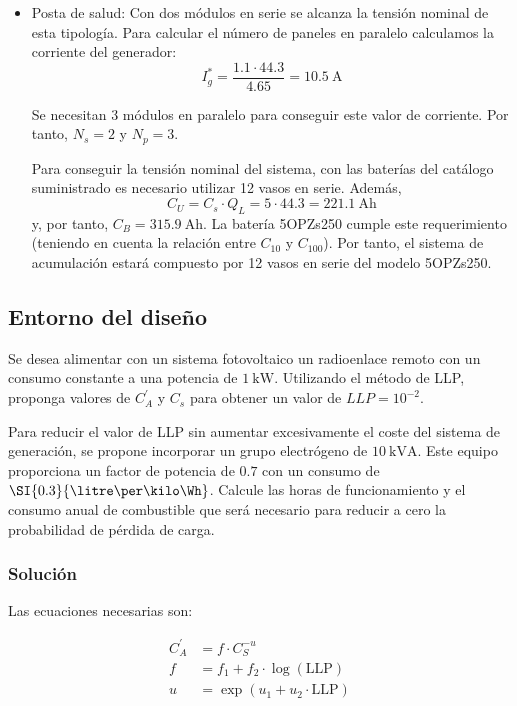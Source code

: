 \begin{itemize}
\item Posta de salud: Con dos módulos en serie se alcanza la tensión
  nominal de esta tipología. Para calcular el número de paneles en
  paralelo calculamos la corriente del generador:
  \[
  I_g^* = \frac{1.1 \cdot 44.3 }{4.65}=\SI{10.5}{\ampere}
  \]

  Se necesitan 3 módulos en paralelo para conseguir este valor de
  corriente. Por tanto, $N_s=2$ y $N_p=3$.

  Para conseguir la tensión nominal del sistema, con las baterías del
  catálogo suministrado es necesario utilizar 12 vasos en
  serie. Además,
  \[
  C_U=C_s \cdot Q_L = 5 \cdot 44.3 = \SI{221.1}{\ampere\hour}
  \]
  y, por tanto, $C_B= \SI{315.9}{\ampere\hour}$. La batería 5OPZs250
  cumple este requerimiento (teniendo en cuenta la relación entre
  $C_{10}$ y $C_{100}$). Por tanto, el sistema de acumulación estará
  compuesto por 12 vasos en serie del modelo 5OPZs250.

\end{itemize}


\subsection{Entorno del diseño}
Se desea alimentar con un sistema fotovoltaico un radioenlace remoto con un consumo constante a una
potencia de $\SI{1}{\kilo\watt}$. Utilizando el método de LLP, proponga
valores de $C_{A}^{'}$ y $C_s$ para obtener un valor de $LLP=10^{-2}$. 

Para reducir el valor de LLP sin aumentar excesivamente el coste del
sistema de generación, se propone incorporar un grupo electrógeno de
$\SI{10}{\kilo\volt\ampere}$. Este equipo proporciona un factor de potencia de
$0.7$ con un consumo de $\SI{0.3}{\litre\per\kilo\Wh}$. Calcule
las horas de funcionamiento y el consumo anual de combustible que será 
necesario para reducir a cero la probabilidad de pérdida de carga.
\subsubsection{Solución}
Las ecuaciones necesarias son:

\begin{align*}
  C_{A}^{'} & = f\cdot C_{S}^{-u} \\
  f &= f_1 + f_2 \cdot \log(\mathrm{LLP}) \\
  u &= \exp(u_1+u_2 \cdot \mathrm{LLP})
\end{align*}

